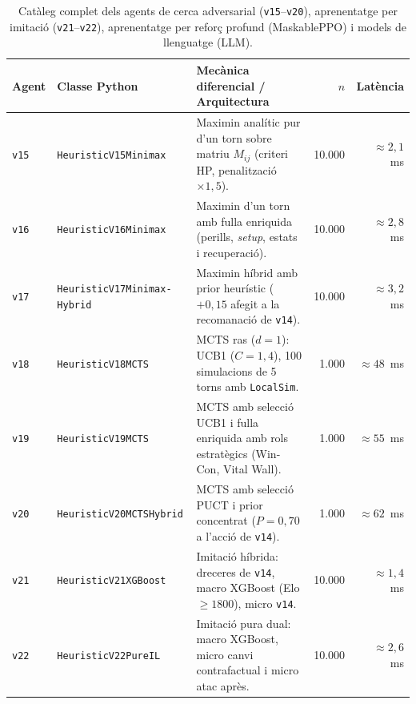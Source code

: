 \begin{table}[htbp]
\centering
\caption{Catàleg complet dels agents de cerca adversarial (\texttt{v15}--\texttt{v20}), aprenentatge per imitació (\texttt{v21}--\texttt{v22}), aprenentatge per reforç profund (MaskablePPO) i models de llenguatge (LLM).}
\label{tab:app_agents_advanced}
\footnotesize
\renewcommand{\arraystretch}{1.15}
\begin{tabularx}{\textwidth}{lp{4.0cm}>{\raggedright\arraybackslash}X rr}
\toprule
\textbf{Agent} & \textbf{Classe Python} & \textbf{Mecànica diferencial / Arquitectura} & \textbf{$n$} & \textbf{Latència} \\
\midrule
\texttt{v15} & \texttt{HeuristicV15Minimax} & Maximin analític pur d'un torn sobre matriu $M_{ij}$ (criteri HP, penalització $\times 1{,}5$). & 10.000 & $\approx 2{,}1$~ms \\
\arrayrulecolor{gray!30}\hline\arrayrulecolor{black}
\texttt{v16} & \texttt{HeuristicV16Minimax} & Maximin d'un torn amb fulla enriquida (perills, \emph{setup}, estats i recuperació). & 10.000 & $\approx 2{,}8$~ms \\
\arrayrulecolor{gray!30}\hline\arrayrulecolor{black}
\texttt{v17} & \texttt{HeuristicV17Minimax-}\newline\texttt{Hybrid} & Maximin híbrid amb prior heurístic ($+0{,}15$ afegit a la recomanació de \texttt{v14}). & 10.000 & $\approx 3{,}2$~ms \\
\arrayrulecolor{gray!30}\hline\arrayrulecolor{black}
\texttt{v18} & \texttt{HeuristicV18MCTS} & MCTS ras ($d=1$): UCB1 ($C=1{,}4$), 100 simulacions de 5 torns amb \texttt{LocalSim}. & 1.000 & $\approx 48$~ms \\
\arrayrulecolor{gray!30}\hline\arrayrulecolor{black}
\texttt{v19} & \texttt{HeuristicV19MCTS} & MCTS amb selecció UCB1 i fulla enriquida amb rols estratègics (Win-Con, Vital Wall). & 1.000 & $\approx 55$~ms \\
\arrayrulecolor{gray!30}\hline\arrayrulecolor{black}
\texttt{v20} & \texttt{HeuristicV20MCTSHybrid} & MCTS amb selecció PUCT i prior concentrat ($P=0{,}70$ a l'acció de \texttt{v14}). & 1.000 & $\approx 62$~ms \\
\arrayrulecolor{gray!30}\hline\arrayrulecolor{black}
\texttt{v21} & \texttt{HeuristicV21XGBoost} & Imitació híbrida: dreceres de \texttt{v14}, macro XGBoost (Elo $\ge 1800$), micro \texttt{v14}. & 10.000 & $\approx 1{,}4$~ms \\
\arrayrulecolor{gray!30}\hline\arrayrulecolor{black}
\texttt{v22} & \texttt{HeuristicV22PureIL} & Imitació pura dual: macro XGBoost, micro canvi contrafactual i micro atac après. & 10.000 & $\approx 2{,}6$~ms \\

\end{tabularx}
\end{table}
